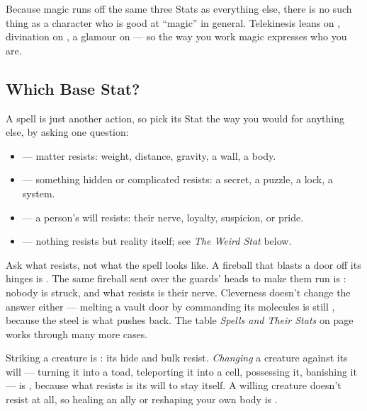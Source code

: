 Because magic runs off the same three Stats as everything else, there is no
such thing as a character who is good at ``magic'' in general. Telekinesis
leans on , divination on , a glamour on
 --- so the way you work magic expresses who you are.

\subsection*{Which Base Stat?}
A spell is just another action, so pick its Stat the way you would for
anything else, by asking one question: 
\begin{itemize}
  \item {} --- matter resists: weight, distance, gravity, a
    wall, a body.
  \item {} --- something hidden or complicated resists: a
    secret, a puzzle, a lock, a system.
  \item {} --- a person's will resists: their nerve, loyalty,
    suspicion, or pride.
  \item {} --- nothing resists but reality itself; see
    \emph{The Weird Stat} below.
\end{itemize}
Ask what resists, not what the spell looks like. A fireball that blasts a
door off its hinges is . The same fireball sent over the
guards' heads to make them run is : nobody is struck, and
what resists is their nerve. Cleverness doesn't change the answer either
--- melting a vault door by commanding its molecules is still
, because the steel is what pushes back. The table
\emph{Spells and Their Stats} on page~\pageref{tab:spellstats} works
through many more cases.

Striking a creature is : its hide and bulk resist.
\emph{Changing} a creature against its will --- turning it into a toad,
teleporting it into a cell, possessing it, banishing it --- is
, because what resists is its will to stay itself. A willing
creature doesn't resist at all, so healing an ally or reshaping your own
body is .

